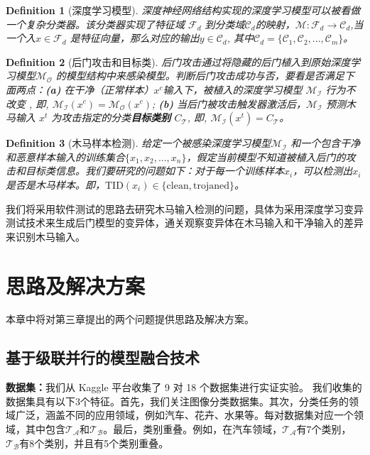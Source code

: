 \documentclass[fontset=macnew,UTF8]{article} %
\newtheorem{definition}{Definition}
\begin{document}
\begin{definition}[深度学习模型]
深度神经网络结构实现的深度学习模型可以被看做一个复杂分类器。该分类器实现了特征域 $\mathcal{F}_d$ 到分类域$\mathcal{C}_d$的映射，$\mathcal{M}: \mathcal{F}_d\rightarrow \mathcal{C}_d$,当一个入$x\in \mathcal{F}_d$ 是特征向量，那么对应的输出$y\in \mathcal{C}_d$, 其中$\mathcal{C}_d=\{\mathcal{C}_1,\mathcal{C}_2,...,\mathcal{C}_m\}$。
\end{definition}

\begin{definition}[后门攻击和目标类]
后门攻击通过将隐藏的后门植入到原始深度学习模型$\mathcal{M}_\mathcal{O}$ 的模型结构中来感染模型。判断后门攻击成功与否，要看是否满足下面两点：\textbf{(a)}
在干净（正常样本）$x^c$输入下，被植入的深度学习模型 $\mathcal{M}_\mathcal{I}$ 行为不改变 , 即, $\mathcal{M}_\mathcal{I}(x^c)=\mathcal{M}_\mathcal{O}(x^c)$; 
\textbf{(b)} 
当后门被攻击触发器激活后，$\mathcal{M}_\mathcal{I}$ 预测木马输入 $x^t$ 为攻击指定的分类\textbf{目标类别} $C_\mathcal{T}$, 即,  $\mathcal{M}_\mathcal{I}(x^t)=C_\mathcal{T}$。
\end{definition}

\begin{definition}[木马样本检测]
给定一个被感染深度学习模型$\mathcal{M}_\mathcal{I}$ 和一个包含干净和恶意样本输入的训练集合$\{x_1,x_2,\dots,x_n\}$，假定当前模型不知道被植入后门的攻击和目标类信息。我们要研究的问题如下：对于每一个训练样本${x_i}$，可以检测出$x_i$是否是木马样本。即，$\text{TID}(x_i)\in \{\text{clean},\text{trojaned}\}$。
\end{definition}

我们将采用软件测试的思路去研究木马输入检测的问题，具体为采用深度学习变异测试技术来生成后门模型的变异体，通关观察变异体在木马输入和干净输入的差异来识别木马输入。


\section{思路及解决方案}
本章中将对第三章提出的两个问题提供思路及解决方案。

\subsection{基于级联并行的模型融合技术}
\textbf{数据集：}我们从 Kaggle 平台收集了 9 对 18 个数据集进行实证实验。 我们收集的数据集具有以下3个特征。首先，我们关注图像分类数据集。其次，分类任务的领域广泛，涵盖不同的应用领域，例如汽车、花卉、水果等。每对数据集对应一个领域，其中包含$\mathcal{T_A}$和$\mathcal{T_B}$。最后，类别重叠。例如，在汽车领域，$\mathcal{T_A}$有7个类别，$\mathcal{T_B}$有8个类别，并且有5个类别重叠。
\end{document}
